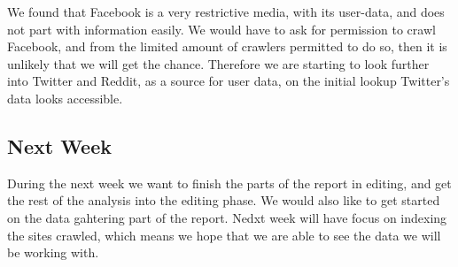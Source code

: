 We found that Facebook is a very restrictive media, with its user-data, and does
not part with information easily. We would have to ask for permission to crawl
Facebook, and from the limited amount of crawlers permitted to do so, then it is
unlikely that we will get the chance. Therefore we are starting to look further into
Twitter and Reddit, as a source for user data, on the initial lookup Twitter's
data looks accessible.

\subsection*{Next Week}
During the next week we want to finish the parts of the report in editing, and
get the rest of the analysis into the editing phase. We would also like to get
started on the data gahtering part of the report. Nedxt week will have focus on
indexing the sites crawled, which means we hope that we are able to see the data
we will be working with.





